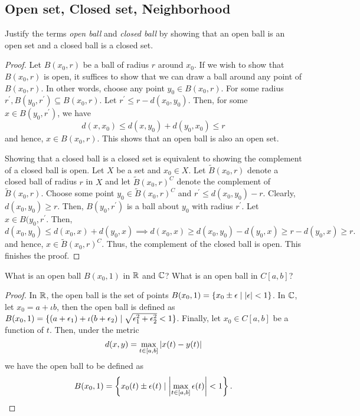 \subsection{Open set, Closed set, Neighborhood}

\begin{question}
    Justify the terms \emph{open ball} and \emph{closed ball} by showing that an open ball is an open set and a closed ball is a closed set.
    \label{section1.3-1}
\end{question}
\begin{proof}
    Let $B(x_0 , r)$ be a ball of radius $r$ around $x_0$. If we wish to show that $B(x_0 , r)$ is open, it suffices to show that we can draw a ball around any point of $B(x_0,r)$. In other words, choose any point $y_0 \in B(x_0 , r)$. For some radius $r^\prime, B(y_0 , r^\prime) \subseteq B(x_0 , r)$.
    Let $r^\prime \leq r - d(x_0 , y_0)$. Then, for some $x \in B(y_0 , r^\prime)$, we have
    \[d(x,x_0) \leq d(x,y_0) + d(y_0,x_0) \leq r\]
    and hence, $x \in B(x_0 , r)$. This shows that an open ball is also an open set.

    Showing that a closed ball is a closed set is equivalent to showing the complement of a closed ball is open. Let $X$ be a set and $x_0 \in X$. Let $\tilde{B}(x_0 , r)$ denote a closed ball of radius $r$ in $X$ and let $\tilde{B}(x_0 , r)^C$ denote the complement of $\tilde{B}(x_0 , r)$. 
    Choose some point $y_0 \in \tilde{B}(x_0 , r)^C$ and $r^\prime \leq d(x_0 , y_0) - r$. Clearly, $d(x_0 , y_0) \geq r$. Then, $B(y_0,r^\prime)$ is a ball about $y_0$ with radius $r^\prime$. Let $x \in B(y_0,r^\prime$. Then,
    \[d(x_0,y_0) \leq d(x_0,x) + d(y_0,x) \implies d(x_0,x) \geq d(x_0,y_0) - d(y_0,x) \geq r - d(y_0,x) \geq r.\]
    and hence, $x \in \tilde{B}(x_0,r)^C$. Thus, the complement of the closed ball is open. This finishes the proof.
\end{proof}

\begin{question}
    What is an open ball $B(x_0  ,1)$ in $\mathbb{R}$ and $\mathbb{C}$? What is an open ball in $C[a,b]$?
    \label{section1.3-2}
\end{question}
\begin{proof}
    In $\mathbb{R}$, the open ball is the set of points $B(x_0 , 1) = \{x_0 \pm \epsilon \mid \left\lvert \epsilon \right\rvert < 1\}$. In $\mathbb{C}$, let $x_0 = a + \iota b$, then the open ball is defined as $B(x_0 , 1) = \{(a + \epsilon_1) + \iota (b + \epsilon_2) \mid \sqrt{\epsilon_1^2 + \epsilon_2^2} < 1 \}$. Finally, let $x_0 \in C[a,b]$ be a function of $t$. Then, under the metric
    \[d(x,y) = \max_{t \in [a,b]} \left\lvert x(t) - y(t) \right\rvert\]
    we have the open ball to be defined as
    \[B(x_0 , 1) = \left\{x_0(t) \pm \epsilon(t) \mid \left\lvert \max_{t \in [a,b]}\epsilon(t) \right\rvert < 1\right\}.\]
\end{proof}

